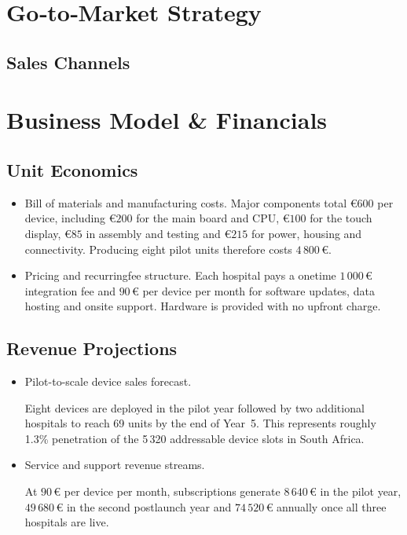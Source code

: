 \documentclass[a4paper,11pt]{article}
\begin{document}
\section{Go‐to‐Market Strategy}
\subsection{Sales Channels}



\section{Business Model \& Financials}
\subsection{Unit Economics}
\begin{itemize}
  \item Bill of materials and manufacturing costs. Major components total \(\text{€}600\) per device, including \(\text{€}200\) for the main board and CPU, \(\text{€}100\) for the touch display, \(\text{€}85\) in assembly and testing and \(\text{€}215\) for power, housing and connectivity. Producing eight pilot units therefore costs \(4\,800\,\text{€}\).
  \item Pricing and recurring\-fee structure. Each hospital pays a one\-time \(1\,000\,\text{€}\) integration fee and \(90\,\text{€}\) per device per month for software updates, data hosting and on\-site support. Hardware is provided with no upfront charge.
\end{itemize}
\subsection{Revenue Projections}
\begin{itemize}
  \item Pilot-to-scale device sales forecast. 
  
  Eight devices are deployed in the pilot year followed by two additional hospitals to reach 69 units by the end of Year~5. This represents roughly 1.3\% penetration of the 5\,320 addressable device slots in South Africa.
  \item Service and support revenue streams. 
  
  At \(90\,\text{€}\) per device per month, subscriptions generate \(8\,640\,\text{€}\) in the pilot year, \(49\,680\,\text{€}\) in the second post\-launch year and \(74\,520\,\text{€}\) annually once all three hospitals are live.
\end{itemize}
\end{document}
